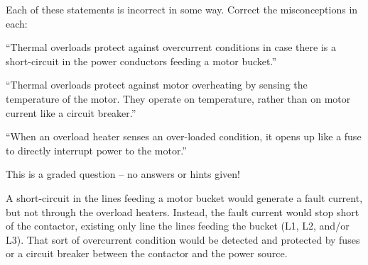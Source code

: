 

Each of these statements is incorrect in some way.  Correct the misconceptions in each:

\vskip 20pt {\narrower \noindent \baselineskip5pt

``Thermal overloads protect against overcurrent conditions in case there is a short-circuit in the power conductors feeding a motor bucket.''

\par} \vskip 100pt


\vskip 20pt {\narrower \noindent \baselineskip5pt

``Thermal overloads protect against motor overheating by sensing the temperature of the motor.  They operate on temperature, rather than on motor current like a circuit breaker.''

\par} \vskip 100pt


\vskip 20pt {\narrower \noindent \baselineskip5pt

``When an overload heater senses an over-loaded condition, it opens up like a fuse to directly interrupt power to the motor.''

\par} \vskip 50pt



\vfil 

\eject






This is a graded question -- no answers or hints given!
 






A short-circuit in the lines feeding a motor bucket would generate a fault current, but not through the overload heaters.  Instead, the fault current would stop short of the contactor, existing only line the lines feeding the bucket (L1, L2, and/or L3).  That sort of overcurrent condition would be detected and protected by fuses or a circuit breaker between the contactor and the power source.

\vskip 10pt

